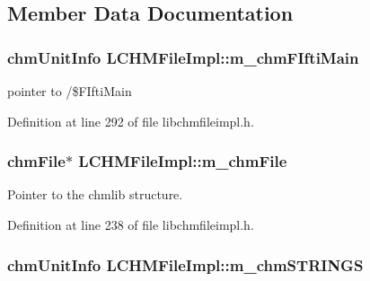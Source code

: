 \subsection{Member Data Documentation}
\hypertarget{classLCHMFileImpl_aff4c9c66f19b11205e4cbdabc7b2d8aa}{
\subsubsection[{m\+\_\+chm\+F\+Ifti\+Main}]{\setlength{\rightskip}{0pt plus 5cm}chm\+Unit\+Info L\+C\+H\+M\+File\+Impl\+::m\+\_\+chm\+F\+Ifti\+Main}}\label{classLCHMFileImpl_aff4c9c66f19b11205e4cbdabc7b2d8aa}


pointer to /\$\+F\+Ifti\+Main 



Definition at line 292 of file libchmfileimpl.\+h.

\hypertarget{classLCHMFileImpl_a82d1d6a252134efcf90a82bf8ffd8493}{
\subsubsection[{m\+\_\+chm\+File}]{\setlength{\rightskip}{0pt plus 5cm}chm\+File$\ast$ L\+C\+H\+M\+File\+Impl\+::m\+\_\+chm\+File}}\label{classLCHMFileImpl_a82d1d6a252134efcf90a82bf8ffd8493}


Pointer to the chmlib structure. 



Definition at line 238 of file libchmfileimpl.\+h.

\hypertarget{classLCHMFileImpl_a73ed5eac37c22b2cd6d7fbc2a78b60db}{
\subsubsection[{m\+\_\+chm\+S\+T\+R\+I\+N\+G\+S}]{\setlength{\rightskip}{0pt plus 5cm}chm\+Unit\+Info L\+C\+H\+M\+File\+Impl\+::m\+\_\+chm\+S\+T\+R\+I\+N\+G\+S}}\label{classLCHMFileImpl_a73ed5eac37c22b2cd6d7fbc2a78b60db}



